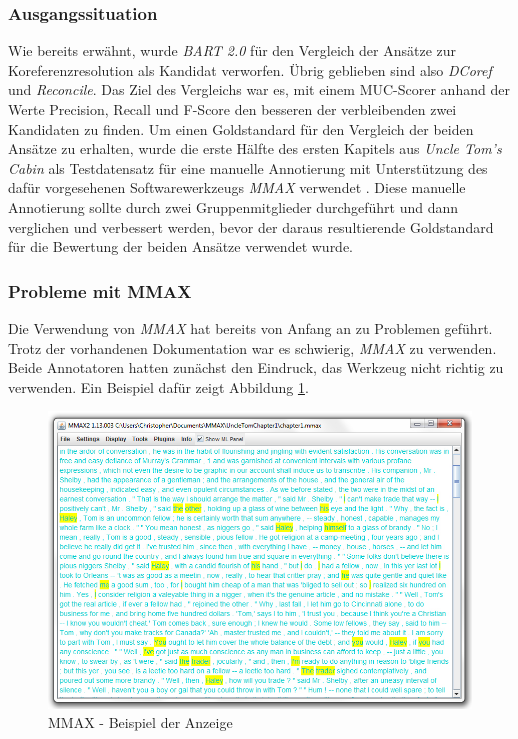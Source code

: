 \documentclass[a4paper,12pt,titlepage=true, ngerman]{scrartcl}
\begin{document}

\subsubsection{Ausgangssituation}\label{Ausgangssituation}

Wie bereits erwähnt, wurde \emph{BART 2.0} für den Vergleich der Ansätze zur Koreferenzresolution 
als Kandidat verworfen. Übrig geblieben sind also \emph{DCoref} und \emph{Reconcile}. 
Das Ziel des Vergleichs war es, mit einem MUC-Scorer \autocite{Bagga98} anhand der Werte Precision, Recall und F-Score 
den besseren der verbleibenden zwei Kandidaten zu finden. 
Um einen Goldstandard für den Vergleich der beiden Ansätze zu erhalten, 
wurde die erste Hälfte des ersten Kapitels aus \emph{Uncle Tom's Cabin} \autocite[]{chris_uncle} 
als Testdatensatz für eine manuelle Annotierung mit Unterstützung 
des dafür vorgesehenen Softwarewerkzeugs \emph{MMAX} \autocite*[]{chris_mmax} 
verwendet \autocite[]{chris_mmax_coll}.
Diese manuelle Annotierung sollte durch zwei Gruppenmitglieder durchgeführt und dann verglichen und 
verbessert werden, bevor der daraus resultierende Goldstandard für die Bewertung 
der beiden Ansätze verwendet wurde.



\subsubsection{Probleme mit MMAX}%

Die Verwendung von \emph{MMAX} hat bereits von Anfang an zu Problemen geführt. 
Trotz der vorhandenen Dokumentation war es schwierig, \emph{MMAX} zu verwenden. 
Beide Annotatoren hatten zunächst den Eindruck, das Werkzeug nicht richtig zu verwenden. 
Ein Beispiel dafür zeigt Abbildung \ref{mmax:anzeige}.

\begin{figure}[ht]
\begin{center}
\includegraphics[width=15cm]{./img/cmich/cm_mmax.jpg}
\caption{MMAX - Beispiel der Anzeige}
\label{mmax:anzeige}
\end{center}
\end{figure}
\end{document}
